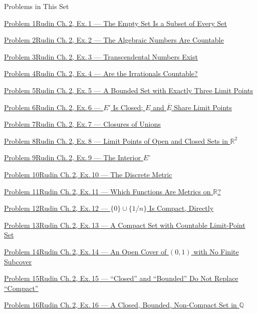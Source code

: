 \documentclass[main.tex]{subfiles}
\begin{document}
\hypertarget{hw-2}{}

\begin{lecturecontents}{Problems in This Set}
  \item \hyperlink{prob:1}{Problem 1\quad Rudin Ch.\,2, Ex.\,1 --- The Empty Set Is a Subset of Every Set}
  \item \hyperlink{prob:2}{Problem 2\quad Rudin Ch.\,2, Ex.\,2 --- The Algebraic Numbers Are Countable}
  \item \hyperlink{prob:3}{Problem 3\quad Rudin Ch.\,2, Ex.\,3 --- Transcendental Numbers Exist}
  \item \hyperlink{prob:4}{Problem 4\quad Rudin Ch.\,2, Ex.\,4 --- Are the Irrationals Countable?}
  \item \hyperlink{prob:5}{Problem 5\quad Rudin Ch.\,2, Ex.\,5 --- A Bounded Set with Exactly Three Limit Points}
  \item \hyperlink{prob:6}{Problem 6\quad Rudin Ch.\,2, Ex.\,6 --- $E'$ Is Closed; $E$ and $\overline E$ Share Limit Points}
  \item \hyperlink{prob:7}{Problem 7\quad Rudin Ch.\,2, Ex.\,7 --- Closures of Unions}
  \item \hyperlink{prob:8}{Problem 8\quad Rudin Ch.\,2, Ex.\,8 --- Limit Points of Open and Closed Sets in $\mathbb R^2$}
  \item \hyperlink{prob:9}{Problem 9\quad Rudin Ch.\,2, Ex.\,9 --- The Interior $E^{\circ}$}
  \item \hyperlink{prob:10}{Problem 10\quad Rudin Ch.\,2, Ex.\,10 --- The Discrete Metric}
  \item \hyperlink{prob:11}{Problem 11\quad Rudin Ch.\,2, Ex.\,11 --- Which Functions Are Metrics on $\mathbb R$?}
  \item \hyperlink{prob:12}{Problem 12\quad Rudin Ch.\,2, Ex.\,12 --- $\{0\}\cup\{1/n\}$ Is Compact, Directly}
  \item \hyperlink{prob:13}{Problem 13\quad Rudin Ch.\,2, Ex.\,13 --- A Compact Set with Countable Limit-Point Set}
  \item \hyperlink{prob:14}{Problem 14\quad Rudin Ch.\,2, Ex.\,14 --- An Open Cover of $(0,1)$ with No Finite Subcover}
  \item \hyperlink{prob:15}{Problem 15\quad Rudin Ch.\,2, Ex.\,15 --- ``Closed'' and ``Bounded'' Do Not Replace ``Compact''}
  \item \hyperlink{prob:16}{Problem 16\quad Rudin Ch.\,2, Ex.\,16 --- A Closed, Bounded, Non-Compact Set in $\mathbb Q$}

\end{lecturecontents}
\end{document}

